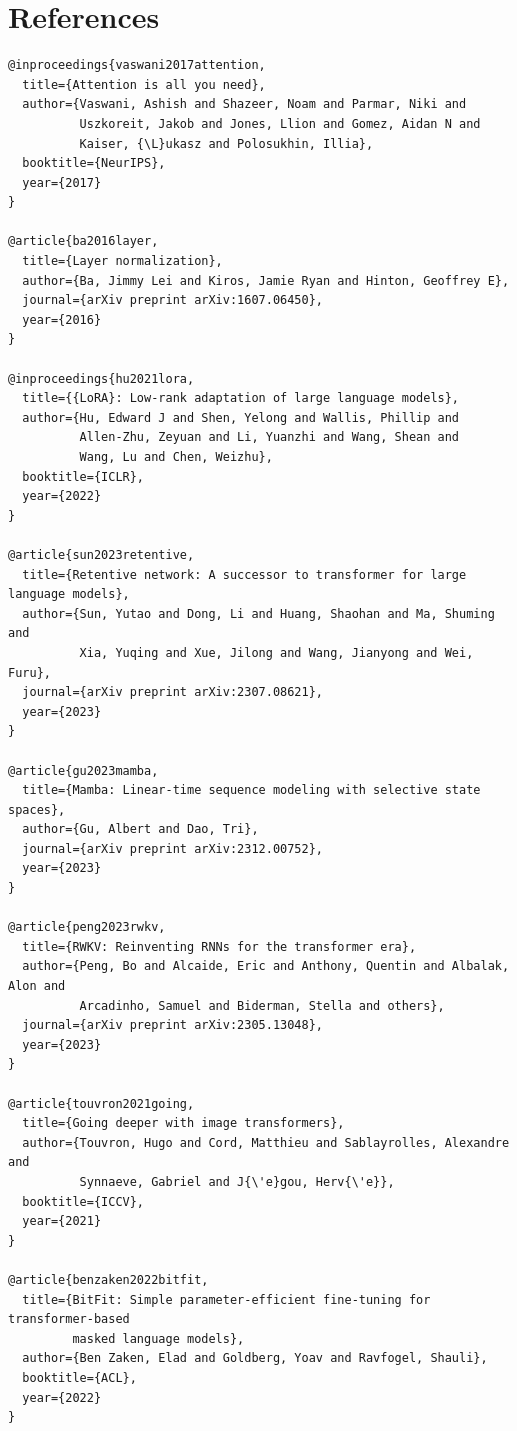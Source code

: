 
\section{References}

\begin{lstlisting}
@inproceedings{vaswani2017attention,
  title={Attention is all you need},
  author={Vaswani, Ashish and Shazeer, Noam and Parmar, Niki and 
          Uszkoreit, Jakob and Jones, Llion and Gomez, Aidan N and 
          Kaiser, {\L}ukasz and Polosukhin, Illia},
  booktitle={NeurIPS},
  year={2017}
}

@article{ba2016layer,
  title={Layer normalization},
  author={Ba, Jimmy Lei and Kiros, Jamie Ryan and Hinton, Geoffrey E},
  journal={arXiv preprint arXiv:1607.06450},
  year={2016}
}

@inproceedings{hu2021lora,
  title={{LoRA}: Low-rank adaptation of large language models},
  author={Hu, Edward J and Shen, Yelong and Wallis, Phillip and 
          Allen-Zhu, Zeyuan and Li, Yuanzhi and Wang, Shean and 
          Wang, Lu and Chen, Weizhu},
  booktitle={ICLR},
  year={2022}
}

@article{sun2023retentive,
  title={Retentive network: A successor to transformer for large language models},
  author={Sun, Yutao and Dong, Li and Huang, Shaohan and Ma, Shuming and 
          Xia, Yuqing and Xue, Jilong and Wang, Jianyong and Wei, Furu},
  journal={arXiv preprint arXiv:2307.08621},
  year={2023}
}

@article{gu2023mamba,
  title={Mamba: Linear-time sequence modeling with selective state spaces},
  author={Gu, Albert and Dao, Tri},
  journal={arXiv preprint arXiv:2312.00752},
  year={2023}
}

@article{peng2023rwkv,
  title={RWKV: Reinventing RNNs for the transformer era},
  author={Peng, Bo and Alcaide, Eric and Anthony, Quentin and Albalak, Alon and 
          Arcadinho, Samuel and Biderman, Stella and others},
  journal={arXiv preprint arXiv:2305.13048},
  year={2023}
}

@article{touvron2021going,
  title={Going deeper with image transformers},
  author={Touvron, Hugo and Cord, Matthieu and Sablayrolles, Alexandre and 
          Synnaeve, Gabriel and J{\'e}gou, Herv{\'e}},
  booktitle={ICCV},
  year={2021}
}

@article{benzaken2022bitfit,
  title={BitFit: Simple parameter-efficient fine-tuning for transformer-based 
         masked language models},
  author={Ben Zaken, Elad and Goldberg, Yoav and Ravfogel, Shauli},
  booktitle={ACL},
  year={2022}
}


\end{lstlisting}
